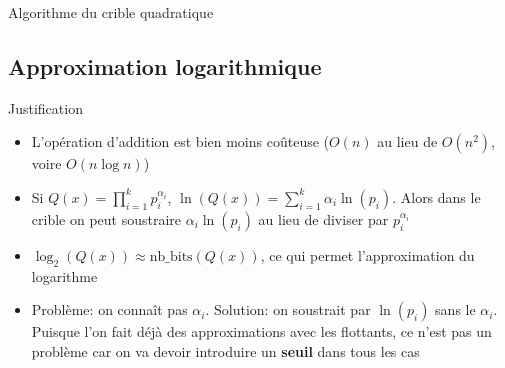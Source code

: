 \documentclass{beamer}
\begin{document}
\begin{frame}
\begin{algorithm}[H]
    \caption{Algorithme du crible quadratique}
    \small
    \begin{algorithmic}[1]

                    \EndWhile
                \EndWhile
            \EndFor
        \EndFor
    \end{algorithmic}
    \end{algorithm}
\end{frame}

\subsection{Approximation logarithmique}

\begin{frame}{Justification}
    \begin{itemize}
        \item L'opération d'addition est bien moins coûteuse ($O(n)$ au lieu de $O(n^2)$, voire $O(n\log n)$)
        \item Si $Q(x) = \prod_{i=1}^k p_i^{\alpha_i}$, $\ln(Q(x)) = \sum_{i=1}^k \alpha_i \ln(p_i)$. Alors dans le crible on peut soustraire $\alpha_i \ln(p_i)$ au lieu de diviser par $p_i^{\alpha_i}$
        \item $\log_2(Q(x)) \approx \text{nb\_bits}(Q(x))$, ce qui permet l'approximation du logarithme
        \item Problème: on connaît pas $\alpha_i$. Solution: on soustrait par $\ln(p_i)$ sans le $\alpha_i$. Puisque l'on fait déjà des approximations avec les flottants, ce n'est pas un problème car on va devoir introduire un \textbf{seuil} dans tous les cas
    \end{itemize}
    
\end{frame}
\end{document}
